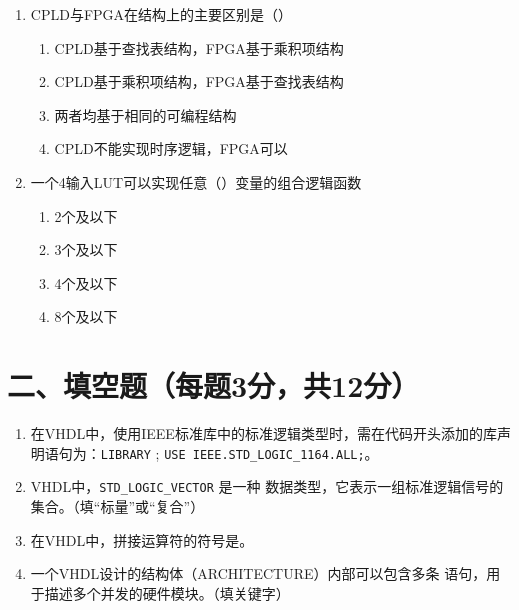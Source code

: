 \begin{enumerate}[label=\arabic*.]
\begin{enumerate}[label=(\Alph*)]
\item 信号赋值和变量赋值都是立即生效的
\item 信号赋值在进程结束时生效，变量赋值立即生效
\item 信号赋值立即生效，变量赋值在进程结束时生效
\item 信号赋值和变量赋值都在进程结束时生效
\end{enumerate}

\item CPLD与FPGA在结构上的主要区别是（\quad）

\begin{enumerate}[label=(\Alph*)]
\item CPLD基于查找表结构，FPGA基于乘积项结构
\item CPLD基于乘积项结构，FPGA基于查找表结构
\item 两者均基于相同的可编程结构
\item CPLD不能实现时序逻辑，FPGA可以
\end{enumerate}

\item 一个4输入LUT可以实现任意（\quad）变量的组合逻辑函数

\begin{enumerate}[label=(\Alph*)]
\item 2个及以下
\item 3个及以下
\item 4个及以下
\item 8个及以下
\end{enumerate}

\end{enumerate}

\section{二、填空题（每题3分，共12分）}

\begin{enumerate}[label=\arabic*.]

\item 在VHDL中，使用IEEE标准库中的标准逻辑类型时，需在代码开头添加的库声明语句为：\texttt{LIBRARY} \underline{\qquad}; \texttt{USE IEEE.STD\_LOGIC\_1164.ALL;}。

\item VHDL中，\texttt{STD\_LOGIC\_VECTOR} 是一种\underline{\qquad} 数据类型，它表示一组标准逻辑信号的集合。（填“标量”或“复合”）

\item 在VHDL中，拼接运算符的符号是\underline{\qquad}。

\item 一个VHDL设计的结构体（ARCHITECTURE）内部可以包含多条\underline{\qquad} 语句，用于描述多个并发的硬件模块。（填关键字）

\end{enumerate}

